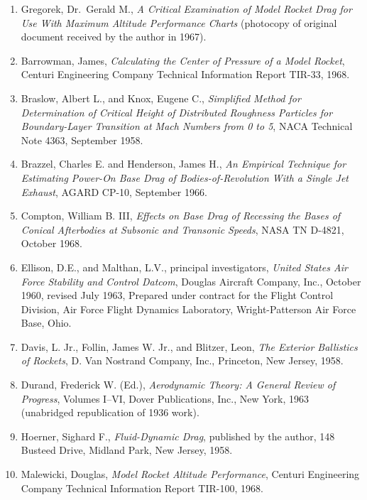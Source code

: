 \label{ch3:sec:refs}
\begin{enumerate}[label=\arabic*.,ref=\arabic*,leftmargin=*]
  \item\label{ch3:ref:1} Gregorek, Dr.\ Gerald M., \emph{A Critical Examination of Model Rocket Drag for Use With Maximum Altitude Performance Charts} (photocopy of original document received by the author in 1967).
  \item\label{ch3:ref:2} Barrowman, James, \emph{Calculating the Center of Pressure of a Model Rocket}, Centuri Engineering Company Technical Information Report TIR-33, 1968.
  \item\label{ch3:ref:3} Braslow, Albert L., and Knox, Eugene C., \emph{Simplified Method for Determination of Critical Height of Distributed Roughness Particles for Boundary-Layer Transition at Mach Numbers from 0 to 5}, NACA Technical Note 4363, September 1958.
  \item\label{ch3:ref:4} Brazzel, Charles E. and Henderson, James H., \emph{An Empirical Technique for Estimating Power-On Base Drag of Bodies-of-Revolution With a Single Jet Exhaust}, AGARD CP-10, September 1966.
  \item\label{ch3:ref:5} Compton, William B. III, \emph{Effects on Base Drag of Recessing the Bases of Conical Afterbodies at Subsonic and Transonic Speeds}, NASA TN D-4821, October 1968.
  \item\label{ch3:ref:6} Ellison, D.E., and Malthan, L.V., principal investigators, \emph{United States Air Force Stability and Control Datcom}, Douglas Aircraft Company, Inc., October 1960, revised July 1963, Prepared under contract for the Flight Control Division, Air Force Flight Dynamics Laboratory, Wright-Patterson Air Force Base, Ohio.
  \item\label{ch3:ref:7} Davis, L. Jr., Follin, James W. Jr., and Blitzer, Leon, \emph{The Exterior Ballistics of Rockets}, D. Van Nostrand Company, Inc., Princeton, New Jersey, 1958.
  \item\label{ch3:ref:8} Durand, Frederick W. (Ed.), \emph{Aerodynamic Theory: A General Review of Progress}, Volumes I--VI, Dover Publications, Inc., New York, 1963 (unabridged republication of 1936 work).
  \item\label{ch3:ref:9} Hoerner, Sighard F., \emph{Fluid-Dynamic Drag}, published by the author, 148 Busteed Drive, Midland Park, New Jersey, 1958.
  \item\label{ch3:ref:10} Malewicki, Douglas, \emph{Model Rocket Altitude Performance}, Centuri Engineering Company Technical Information Report TIR-100, 1968.

\end{enumerate}
